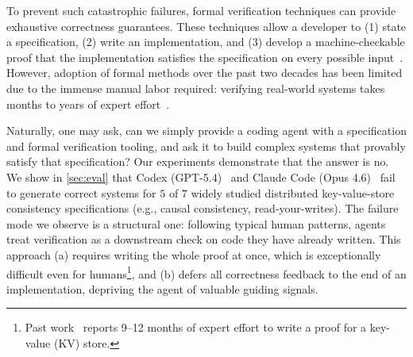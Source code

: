 To prevent such catastrophic failures, formal verification techniques can provide exhaustive correctness guarantees. These techniques allow a developer to (1) state a specification, (2) write an implementation, and (3) develop a machine-checkable proof that the implementation satisfies the specification on every possible input~\cite{coq, lean, verus, dafny}.
However, adoption of formal methods over the past two decades has been limited due to the immense manual labor required: verifying real-world systems takes months to years of expert effort~\cite{sel4,compcert,fscq,ironfleet,verdi,chapar}.


Naturally, one may ask, can we simply provide a coding agent with a specification and formal verification tooling, and ask it to build complex systems that provably satisfy that specification? Our experiments demonstrate that the answer is no.
We show in \cref{sec:eval} that Codex (GPT-5.4)~\cite{codex} and Claude Code (Opus 4.6)~\cite{claude-code} fail to generate correct systems for $5$ of $7$ widely studied distributed key-value-store consistency specifications (e.g., causal consistency, read-your-writes). The failure mode we observe is a structural one: following typical human patterns, agents treat verification as a downstream check on code they have already written. This approach (a) requires writing the whole proof at once, which is exceptionally difficult even for humans\footnote{Past work~\cite{chapar} reports 9--12 months of expert effort to write a proof for a key-value (KV) store.}, and (b) defers all correctness feedback to the end of an implementation, depriving the agent of valuable guiding signals. 


